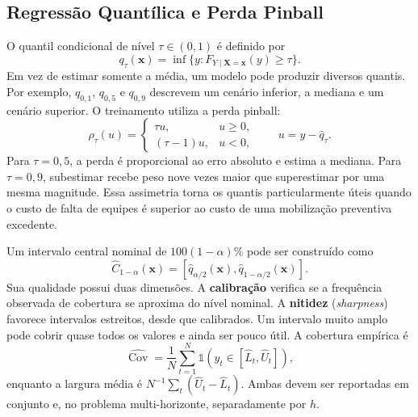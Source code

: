 \subsection{Regressão Quantílica e Perda Pinball}

O quantil condicional de nível $\tau\in(0,1)$ é definido por
\begin{equation}
    q_{\tau}(\mathbf{x})
    =\inf\{y:F_{Y\mid\mathbf{X}=\mathbf{x}}(y)\geq\tau\}.
    \label{eq:quantil_condicional}
\end{equation}
Em vez de estimar somente a média, um modelo pode produzir diversos quantis. Por exemplo, $q_{0,1}$, $q_{0,5}$ e $q_{0,9}$ descrevem um cenário inferior, a mediana e um cenário superior. O treinamento utiliza a perda pinball:
\begin{equation}
    \rho_{\tau}(u)
    =
    \begin{cases}
        \tau u, & u\geq0,\\
        (\tau-1)u, & u<0,
    \end{cases}
    \qquad u=y-\hat{q}_{\tau}.
    \label{eq:pinball}
\end{equation}
Para $\tau=0{,}5$, a perda é proporcional ao erro absoluto e estima a mediana. Para $\tau=0{,}9$, subestimar recebe peso nove vezes maior que superestimar por uma mesma magnitude. Essa assimetria torna os quantis particularmente úteis quando o custo de falta de equipes é superior ao custo de uma mobilização preventiva excedente.

Um intervalo central nominal de $100(1-\alpha)\%$ pode ser construído como
\begin{equation}
    \widehat{C}_{1-\alpha}(\mathbf{x})
    =\left[\hat{q}_{\alpha/2}(\mathbf{x}),
    \hat{q}_{1-\alpha/2}(\mathbf{x})\right].
    \label{eq:intervalo_quantil}
\end{equation}
Sua qualidade possui duas dimensões. A \textbf{calibração} verifica se a frequência observada de cobertura se aproxima do nível nominal. A \textbf{nitidez} (\textit{sharpness}) favorece intervalos estreitos, desde que calibrados. Um intervalo muito amplo pode cobrir quase todos os valores e ainda ser pouco útil. A cobertura empírica é
\begin{equation}
    \widehat{\operatorname{Cov}}
    =\frac{1}{N}\sum_{t=1}^{N}
    \mathbb{1}\!\left(y_t\in[\hat{L}_t,\hat{U}_t]\right),
    \label{eq:cobertura_empirica}
\end{equation}
enquanto a largura média é $N^{-1}\sum_t(\hat{U}_t-\hat{L}_t)$. Ambas devem ser reportadas em conjunto e, no problema multi-horizonte, separadamente por $h$.

